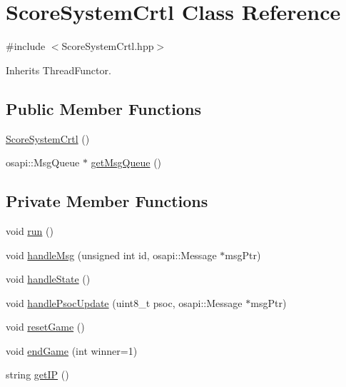 \hypertarget{class_score_system_crtl}{}\section{Score\+System\+Crtl Class Reference}
\label{class_score_system_crtl}


{\ttfamily \#include $<$Score\+System\+Crtl.\+hpp$>$}



Inherits Thread\+Functor.

\subsection*{Public Member Functions}
\begin{DoxyCompactItemize}
\item 
\hyperlink{class_score_system_crtl_aa5e275c79e3e60dec6eb12da70ebe382}{Score\+System\+Crtl} ()
\item 
osapi\+::\+Msg\+Queue $\ast$ \hyperlink{class_score_system_crtl_a5dc4b60ddc680b5a8c8e6ab646e7d049}{get\+Msg\+Queue} ()
\end{DoxyCompactItemize}
\subsection*{Private Member Functions}
\begin{DoxyCompactItemize}
\item 
void \hyperlink{class_score_system_crtl_a04176fe6a2ed0c8fdfb4394426357d76}{run} ()
\item 
void \hyperlink{class_score_system_crtl_a5c168a573054312aedf6c7da099f7ba4}{handle\+Msg} (unsigned int id, osapi\+::\+Message $\ast$msg\+Ptr)
\item 
void \hyperlink{class_score_system_crtl_ae36d14423417173e6b5e3c5196d76e99}{handle\+State} ()
\item 
void \hyperlink{class_score_system_crtl_a5644cff9cfc9fbe9ca962823be333cf0}{handle\+Psoc\+Update} (uint8\+\_\+t psoc, osapi\+::\+Message $\ast$msg\+Ptr)
\item 
void \hyperlink{class_score_system_crtl_a2de992b7e2734b0be919da1bc460ea48}{reset\+Game} ()
\item 
void \hyperlink{class_score_system_crtl_a4cfa5045fdaa955fc3a1c183a3698ec9}{end\+Game} (int winner=1)
\item 
string \hyperlink{class_score_system_crtl_ae15d59e88b416b1f13249c3f1a1edafa}{get\+IP} ()
\end{DoxyCompactItemize}
